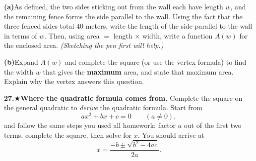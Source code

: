 \documentclass[12pt]{article}
\begin{document}
\medskip
\textbf{(a)}\quad As defined, the two sides sticking out from the wall each have length $w$, and the remaining fence forms the
side parallel to the wall. Using the fact that the three fenced sides total $40$ meters, write the length of the
side parallel to the wall in terms of $w$. Then, using area $=$ length $\times$ width, write a function $A(w)$ for
the enclosed area. \textit{(Sketching the pen first will help.)}
\vspace{10cm}

\newpage
\textbf{(b)}\quad Expand $A(w)$ and complete the square (or use the vertex formula) to find the width $w$ that gives
the \textbf{maximum} area, and state that maximum area. Explain why the vertex answers this question.

\newpage
\textbf{27.}\quad$\bigstar$\quad \textbf{Where the quadratic formula comes from.} Complete the square on the general
quadratic to \emph{derive} the quadratic formula. Start from
\[
  ax^2 + bx + c = 0 \qquad (a \neq 0),
\]
and follow the same steps you used all homework: factor $a$ out of the first two terms, complete the square, then
solve for $x$. You should arrive at
\[
  x = \frac{-b \pm \sqrt{b^2 - 4ac}}{2a}.
\]
\newpage
\end{document}
